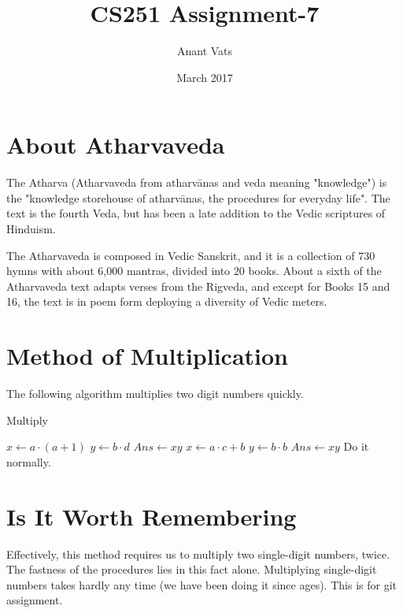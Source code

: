 \documentclass{article}
\title{CS251 Assignment-7}
\author{Anant Vats }
\date{March 2017}
\begin{document}
\maketitle
\section{About Atharvaveda}
The Atharva (Atharvaveda from atharvānas and veda meaning "knowledge") is the "knowledge storehouse of atharvānas, the procedures for everyday life". The text is the fourth Veda, but has been a late addition to the Vedic scriptures of Hinduism.\cite{wikicite1}

The Atharvaveda is composed in Vedic Sanskrit, and it is a collection of 730 hymns with about 6,000 mantras, divided into 20 books. About a sixth of the Atharvaveda text adapts verses from the Rigveda, and except for Books 15 and 16, the text is in poem form deploying a diversity of Vedic meters.\cite{wikicite1} 

\section{Method of Multiplication}
The following algorithm multiplies two digit numbers quickly.
\begin{algorithm}
\caption{Multiply}\label{Merge}
\begin{algorithmic}[1]
  
\State $x\gets a\cdot (a+1)$
\State $y\gets b\cdot d$
\State $Ans\gets xy$
\EndIf
{} 
\State $x\gets a\cdot c+b$
\State$y\gets b\cdot b$
\State$Ans\gets xy$
\Else
\State Do it normally.
\EndIf
\EndProcedure
\Statex

\end{algorithmic}
\end{algorithm}

\section{Is It Worth Remembering}

Effectively, this method requires us to multiply two single-digit numbers, twice. The fastness of the procedures lies in this fact alone. Multiplying single-digit numbers takes hardly any time (we have been doing it since ages). This is for git assignment.
\end{document}
